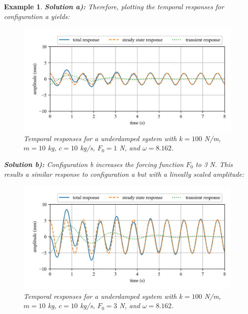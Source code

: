 \documentclass[12pt,letter]{article}
\newtheorem{ex}{Example}
\numberwithin{ex}{section} %
\newenvironment{example}{\begin{mdframed}[middlelinewidth=0.5mm]\begin{ex}\normalfont}{\end{ex}\end{mdframed}}
\numberwithin{re}{section} %
\begin{document}
\begin{example}
				
				\noindent\textbf{Solution a):} Therefore, plotting the temporal responses for configuration a yields:
				\begin{figure}[H]
					\centering
					\includegraphics[]{../Figures/homogeneous_and_particular_solutions_in_resonance_a.png}
					\caption{Temporal responses for a underdamped system with $k=100$ N/m, $m=10$ kg,  $c=10$ kg/s, $F_0=1$ N, and $\omega = 8.162$.}
				\end{figure}			
				 
				\noindent\textbf{Solution b):} Configuration b increases the forcing function $F_0$ to 3 N. This results a similar response to configuration a but with a lineally scaled amplitude:
				\begin{figure}[H]
					\centering
					\includegraphics[]{../Figures/homogeneous_and_particular_solutions_in_resonance_b.png}
					\caption{Temporal responses for a underdamped system with $k=100$ N/m, $m=10$ kg,  $c=10$ kg/s, $F_0=3$ N, and $\omega = 8.162$.}
				\end{figure}			
				

\end{example}
\end{document}

